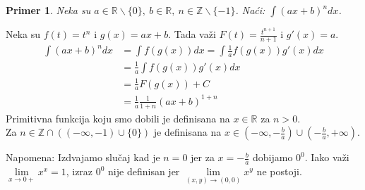 \documentclass{article}
\newtheorem{prim}{Primer}[section]
\begin{document}
\begin{primbox}
    \begin{prim}
        Neka su $a \in \mathbb{R}\backslash\{0\},\ b\in\mathbb{R},\ n \in \mathbb{Z}\backslash\{-1\}$. Naći: $\int(ax + b)^ndx$.
    \end{prim}
    Neka su $f(t) = t^n$ i $g(x) = ax+b$. Tada važi $F(t) = \frac{t^{n+1}}{n+1}$ i $g'(x) = a$.
    \begin{align*}
        \int(ax + b)^ndx & = \int f(g(x))dx = \int\frac{1}{a}f(g(x))g'(x)dx
        \\ & = \frac{1}{a}\int f(g(x))g'(x)dx
        \\ & = \frac{1}{a}F(g(x)) + C
        \\ & = \frac{1}{a}\frac{1}{1+n}(ax + b)^{1+n}
    \end{align*}
    Primitivna funkcija koju smo dobili je definisana na $x \in \mathbb{R}$ za $n > 0$.\\
    Za $n\in \mathbb{Z} \cap ((-\infty, -1)\cup\{0\})$ je definisana na $x \in (-\infty, -\frac{b}{a})\cup(-\frac{b}{a}, +\infty)$.\par
    Napomena: Izdvajamo slučaj kad je $n=0$ jer za $x=-\frac{b}{a}$ dobijamo $0^0$. Iako važi $\lim\limits_{x\rightarrow0+}x^x = 1$, izraz
    $0^0$ nije definisan jer $\lim\limits_{(x, y)\rightarrow(0,0)} x^y$ ne postoji.
\end{primbox}
\end{document}
